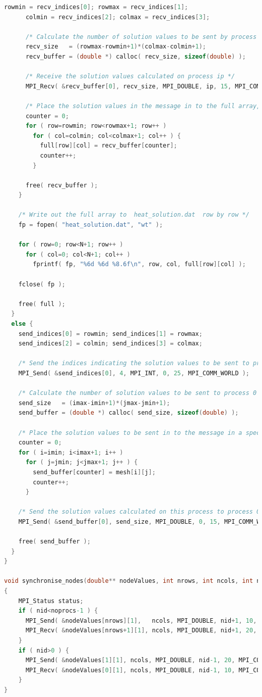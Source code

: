 \documentclass{article}
\begin{document}
\begin{lstlisting}[language=C,frame=single]
      rowmin = recv_indices[0]; rowmax = recv_indices[1];
      colmin = recv_indices[2]; colmax = recv_indices[3];

      /* Calculate the number of solution values to be sent by process ip */
      recv_size   = (rowmax-rowmin+1)*(colmax-colmin+1);
      recv_buffer = (double *) calloc( recv_size, sizeof(double) );

      /* Receive the solution values calculated on process ip */
      MPI_Recv( &recv_buffer[0], recv_size, MPI_DOUBLE, ip, 15, MPI_COMM_WORLD, &status );

      /* Place the solution values in the message in to the full array, in order */
      counter = 0;
      for ( row=rowmin; row<rowmax+1; row++ )
        for ( col=colmin; col<colmax+1; col++ ) {
          full[row][col] = recv_buffer[counter];
          counter++;
        }

      free( recv_buffer );
    }

    /* Write out the full array to  heat_solution.dat  row by row */
    fp = fopen( "heat_solution.dat", "wt" );

    for ( row=0; row<N+1; row++ )
      for ( col=0; col<N+1; col++ )
        fprintf( fp, "%6d %6d %8.6f\n", row, col, full[row][col] );

    fclose( fp );

    free( full );
  }
  else {
    send_indices[0] = rowmin; send_indices[1] = rowmax;
    send_indices[2] = colmin; send_indices[3] = colmax;

    /* Send the indices indicating the solution values to be sent to process 0 */
    MPI_Send( &send_indices[0], 4, MPI_INT, 0, 25, MPI_COMM_WORLD );

    /* Calculate the number of solution values to be sent to process 0 */
    send_size   = (imax-imin+1)*(jmax-jmin+1);
    send_buffer = (double *) calloc( send_size, sizeof(double) );

    /* Place the solution values to be sent in to the message in a specific order */
    counter = 0;
    for ( i=imin; i<imax+1; i++ )
      for ( j=jmin; j<jmax+1; j++ ) {
        send_buffer[counter] = mesh[i][j];
        counter++;
      }

    /* Send the solution values calculated on this process to process 0 */
    MPI_Send( &send_buffer[0], send_size, MPI_DOUBLE, 0, 15, MPI_COMM_WORLD );

    free( send_buffer );
  }
}

void synchronise_nodes(double** nodeValues, int nrows, int ncols, int nid, int noprocs)
{
    MPI_Status status;
    if ( nid<noprocs-1 ) {
      MPI_Send( &nodeValues[nrows][1],   ncols, MPI_DOUBLE, nid+1, 10, MPI_COMM_WORLD );
      MPI_Recv( &nodeValues[nrows+1][1], ncols, MPI_DOUBLE, nid+1, 20, MPI_COMM_WORLD, &status  );
    }
    if ( nid>0 ) {
      MPI_Send( &nodeValues[1][1], ncols, MPI_DOUBLE, nid-1, 20, MPI_COMM_WORLD );
      MPI_Recv( &nodeValues[0][1], ncols, MPI_DOUBLE, nid-1, 10, MPI_COMM_WORLD, &status  );
    }
}



\end{lstlisting}
\end{document}
